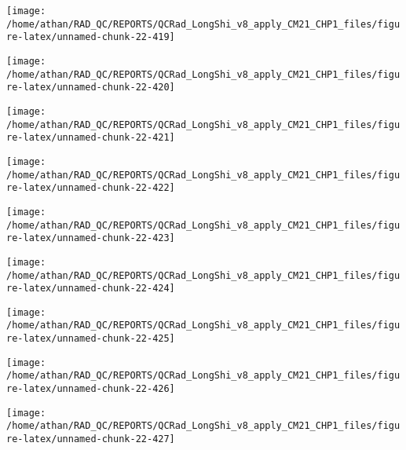 \documentclass[
  10pt,
  a4paper,oneside]{article}
\begin{document}
\begin{center}\texttt{[image: /home/athan/RAD\_QC/REPORTS/QCRad\_LongShi\_v8\_apply\_CM21\_CHP1\_files/figure-latex/unnamed-chunk-22-419]} \end{center}

\begin{center}\texttt{[image: /home/athan/RAD\_QC/REPORTS/QCRad\_LongShi\_v8\_apply\_CM21\_CHP1\_files/figure-latex/unnamed-chunk-22-420]} \end{center}

\begin{center}\texttt{[image: /home/athan/RAD\_QC/REPORTS/QCRad\_LongShi\_v8\_apply\_CM21\_CHP1\_files/figure-latex/unnamed-chunk-22-421]} \end{center}

\begin{center}\texttt{[image: /home/athan/RAD\_QC/REPORTS/QCRad\_LongShi\_v8\_apply\_CM21\_CHP1\_files/figure-latex/unnamed-chunk-22-422]} \end{center}

\begin{center}\texttt{[image: /home/athan/RAD\_QC/REPORTS/QCRad\_LongShi\_v8\_apply\_CM21\_CHP1\_files/figure-latex/unnamed-chunk-22-423]} \end{center}

\begin{center}\texttt{[image: /home/athan/RAD\_QC/REPORTS/QCRad\_LongShi\_v8\_apply\_CM21\_CHP1\_files/figure-latex/unnamed-chunk-22-424]} \end{center}

\begin{center}\texttt{[image: /home/athan/RAD\_QC/REPORTS/QCRad\_LongShi\_v8\_apply\_CM21\_CHP1\_files/figure-latex/unnamed-chunk-22-425]} \end{center}

\begin{center}\texttt{[image: /home/athan/RAD\_QC/REPORTS/QCRad\_LongShi\_v8\_apply\_CM21\_CHP1\_files/figure-latex/unnamed-chunk-22-426]} \end{center}

\begin{center}\texttt{[image: /home/athan/RAD\_QC/REPORTS/QCRad\_LongShi\_v8\_apply\_CM21\_CHP1\_files/figure-latex/unnamed-chunk-22-427]} \end{center}
\end{document}
